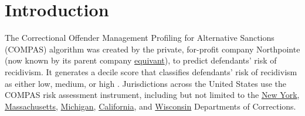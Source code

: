 \documentclass[water,article,submit,moreauthors,pdftex]{mdpi}
\begin{document}

\hypertarget{introduction}{%
\section{Introduction}\label{introduction}}

The Correctional Offender Management Profiling for Alternative Sanctions
(COMPAS) algorithm was created by the private, for-profit company
Northpointe (now known by its parent company
\href{https://www.equivant.com/faq/}{equivant}), to predict defendants'
risk of recidivism. It generates a decile score that classifies
defendants' risk of recidivism as either low, medium, or high
\citep{angwin2016machine}. Jurisdictions across the United States use
the COMPAS risk assessment instrument, including but not limited to the
\href{https://doccs.ny.gov/system/files/documents/2020/11/8500.pdf}{New
York},
\href{https://hdsr.mitpress.mit.edu/pub/hzwo7ax4/release/4}{Massachusetts},
\href{https://hdsr.mitpress.mit.edu/pub/hzwo7ax4/release/4}{Michigan},
\href{https://hdsr.mitpress.mit.edu/pub/hzwo7ax4/release/4}{California},
and \href{https://doc.wi.gov/Pages/AboutDOC/COMPAS.aspx}{Wisconsin}
Departments of Corrections.
\end{document}
